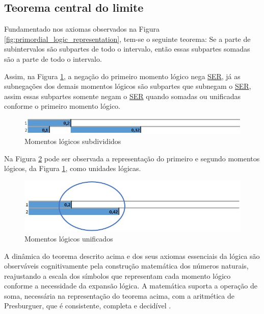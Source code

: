 \subsection{Teorema central do limite}
Fundamentado nos axiomas observados na Figura \ref{fig:primordial_logic_representation}, tem-se o seguinte teorema: Se a parte de subintervalos são subpartes de todo o intervalo, então essas subpartes somadas são a parte de todo o intervalo.

Assim, na Figura \ref{fig:second_logical_moment}, a negação do primeiro momento lógico nega \underline{SER}, já as subnegações dos demais momentos lógicos são subpartes que subnegam o \underline{SER}, assim essas subpartes somente negam o \underline{SER} quando somadas ou unificadas conforme o primeiro momento lógico.
	\begin{figure}[H]
	\caption{Momentos lógicos subdivididos}
	\label{fig:second_logical_moment}
	\centering
	\includegraphics[scale=.85]{sections/images/second_logical_moment.jpg}
	\end{figure}

Na Figura \ref{fig:logical_units} pode ser observada a representação do primeiro e segundo momentos lógicos, da Figura \ref{fig:second_logical_moment}, como unidades lógicas.
	\begin{figure}[H]
	\caption{Momentos lógicos unificados}
	\label{fig:logical_units}
	\centering
	\includegraphics[scale=.85]{sections/images/logical_units.jpg}
	\end{figure}

A dinâmica do teorema descrito acima e dos seus axiomas essenciais da lógica são observáveis cognitivamente pela construção matemática dos números naturais, reajustando a escala dos símbolos que representam cada momento lógico conforme a necessidade da expansão lógica. A matemática suporta a operação de soma, necessária na representação do teorema acima, com a aritmética de Presburguer, que é consistente, completa e decidível \cite{wiki_AritmeticaPresburger}.

